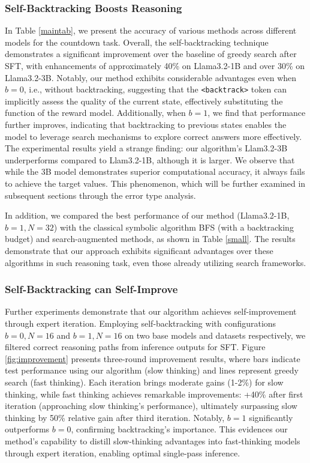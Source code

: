\documentclass{article}
\theoremstyle{plain}
\theoremstyle{definition}
\theoremstyle{remark}
\begin{document}
\subsubsection{Self-Backtracking Boosts Reasoning}
In Table \ref{maintab}, we present the accuracy of various methods across different models for the countdown task.
Overall, the self-backtracking technique demonstrates a significant improvement over the baseline of greedy search after SFT, with enhancements of approximately 40\% on Llama3.2-1B and over 30\% on Llama3.2-3B. Notably, our method exhibits considerable advantages even when \( b = 0 \), i.e., without backtracking, suggesting that the \texttt{<backtrack>} token can implicitly assess the quality of the current state, effectively substituting the function of the reward model. Additionally, when \( b = 1 \), we find that performance further improves, indicating that backtracking to previous states enables the model to leverage search mechanisms to explore correct answers more effectively. 
The experimental results yield a strange finding: our algorithm's Llam3.2-3B underperforms compared to Llam3.2-1B, although it is larger. We observe that while the 3B model demonstrates superior computational accuracy, it always fails to achieve the target values. This phenomenon, which will be further examined in subsequent sections through the error type analysis.

In addition, we compared the best performance of our method (Llama3.2-1B, $b=1, N=32$) with the classical symbolic algorithm BFS (with a backtracking budget) and search-augmented methods, as shown in Table \ref{small}. The results demonstrate that our approach exhibits significant advantages over these algorithms in such reasoning task, even those already utilizing search frameworks.


\subsubsection{Self-Backtracking can Self-Improve}
Further experiments demonstrate that our algorithm achieves self-improvement through expert iteration. Employing self-backtracking with configurations $b=0, N=16$ and $b=1, N=16$ on two base models and datasets respectively, we filtered correct reasoning paths from inference outputs for SFT. Figure \ref{fig:improvement} presents three-round improvement results, where bars indicate test performance using our algorithm (slow thinking) and lines represent greedy search (fast thinking). Each iteration brings moderate gains (1-2\%) for slow thinking, while fast thinking achieves remarkable improvements: +40\% after first iteration (approaching slow thinking's performance), ultimately surpassing slow thinking by 50\% relative gain after third iteration. Notably, $b=1$ significantly outperforms $b=0$, confirming backtracking's importance. This evidences our method's capability to distill slow-thinking advantages into fast-thinking models through expert iteration, enabling optimal single-pass inference.
\end{document}
